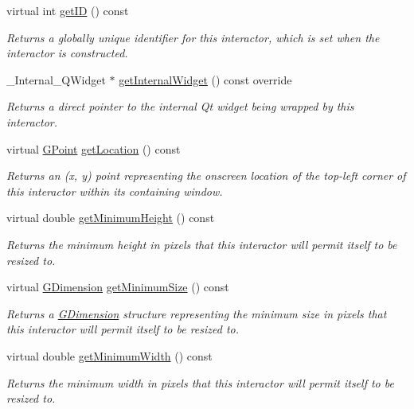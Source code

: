 \begin{DoxyCompactItemize}
virtual int \mbox{\hyperlink{classsgl_1_1GInteractor_a9c9659a6c6ba66b4107ba59c95a24241}{get\+ID}} () const
\begin{DoxyCompactList}\small\item\em Returns a globally unique identifier for this interactor, which is set when the interactor is constructed. \end{DoxyCompactList}\item 
\+\_\+\+Internal\+\_\+\+Q\+Widget $\ast$ \mbox{\hyperlink{classsgl_1_1GRadioButton_a2f6b36b2517087dc90a366b5ce1f5323}{get\+Internal\+Widget}} () const override
\begin{DoxyCompactList}\small\item\em Returns a direct pointer to the internal Qt widget being wrapped by this interactor. \end{DoxyCompactList}\item 
virtual \mbox{\hyperlink{structsgl_1_1GPoint}{G\+Point}} \mbox{\hyperlink{classsgl_1_1GInteractor_a4f83802015511edeb63b892830812c11}{get\+Location}} () const
\begin{DoxyCompactList}\small\item\em Returns an (x, y) point representing the onscreen location of the top-\/left corner of this interactor within its containing window. \end{DoxyCompactList}\item 
virtual double \mbox{\hyperlink{classsgl_1_1GInteractor_aed4b0075fcc434499c3cb3e46896bda3}{get\+Minimum\+Height}} () const
\begin{DoxyCompactList}\small\item\em Returns the minimum height in pixels that this interactor will permit itself to be resized to. \end{DoxyCompactList}\item 
virtual \mbox{\hyperlink{structsgl_1_1GDimension}{G\+Dimension}} \mbox{\hyperlink{classsgl_1_1GInteractor_a66b5af0b32493b4d597ca0a3df2049ea}{get\+Minimum\+Size}} () const
\begin{DoxyCompactList}\small\item\em Returns a \mbox{\hyperlink{structsgl_1_1GDimension}{G\+Dimension}} structure representing the minimum size in pixels that this interactor will permit itself to be resized to. \end{DoxyCompactList}\item 
virtual double \mbox{\hyperlink{classsgl_1_1GInteractor_a59e668114fe3d49d2a0f28deb258f7c8}{get\+Minimum\+Width}} () const
\begin{DoxyCompactList}\small\item\em Returns the minimum width in pixels that this interactor will permit itself to be resized to. \end{DoxyCompactList}\item 

\end{DoxyCompactItemize}
